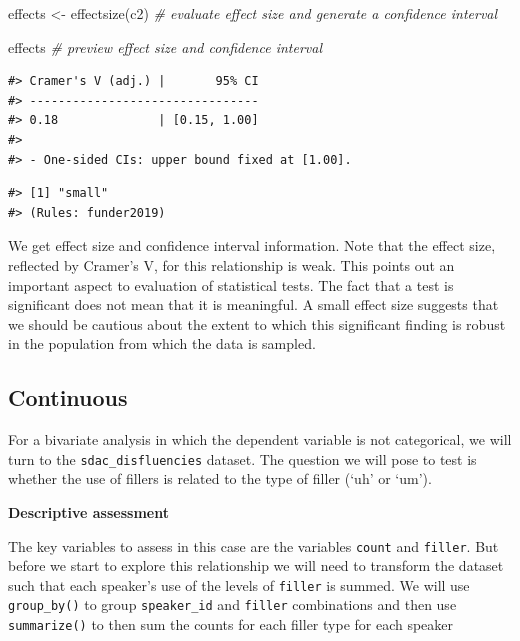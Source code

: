 \documentclass[
  letterpaper,
]{scrbook}
\newenvironment{Shaded}{\begin{snugshade}}{\end{snugshade}}
\newcommand{\CommentTok}[1]{\textcolor[rgb]{0.00,0.00,0.00}{\textit{#1}}}
\newcommand{\FunctionTok}[1]{\textcolor[rgb]{0.00,0.00,0.00}{#1}}
\newcommand{\NormalTok}[1]{\textcolor[rgb]{0.00,0.00,0.00}{#1}}
\newcommand{\OtherTok}[1]{\textcolor[rgb]{0.00,0.00,0.00}{#1}}
\newcommand{\SpecialCharTok}[1]{\textcolor[rgb]{0.00,0.00,0.00}{#1}}
\begin{document}
\begin{Shaded}
\begin{Highlighting}[]
\NormalTok{effects }\OtherTok{\textless{}{-}} \FunctionTok{effectsize}\NormalTok{(c2) }\CommentTok{\# evaluate effect size and generate a confidence interval}

\NormalTok{effects }\CommentTok{\# preview effect size and confidence interval}
\end{Highlighting}
\end{Shaded}

\begin{verbatim}
#> Cramer's V (adj.) |       95% CI
#> --------------------------------
#> 0.18              | [0.15, 1.00]
#> 
#> - One-sided CIs: upper bound fixed at [1.00].
\end{verbatim}

\begin{Shaded}
\end{Shaded}

\begin{verbatim}
#> [1] "small"
#> (Rules: funder2019)
\end{verbatim}

We get effect size and confidence interval information. Note that the
effect size, reflected by Cramer's V, for this relationship is weak.
This points out an important aspect to evaluation of statistical tests.
The fact that a test is significant does not mean that it is meaningful.
A small effect size suggests that we should be cautious about the extent
to which this significant finding is robust in the population from which
the data is sampled.

\hypertarget{continuous-1}{%
\subsection{Continuous}\label{continuous-1}}

For a bivariate analysis in which the dependent variable is not
categorical, we will turn to the \texttt{sdac\_disfluencies} dataset.
The question we will pose to test is whether the use of fillers is
related to the type of filler (`uh' or `um').

\textbf{Descriptive assessment}

The key variables to assess in this case are the variables
\texttt{count} and \texttt{filler}. But before we start to explore this
relationship we will need to transform the dataset such that each
speaker's use of the levels of \texttt{filler} is summed. We will use
\texttt{group\_by()} to group \texttt{speaker\_id} and \texttt{filler}
combinations and then use \texttt{summarize()} to then sum the counts
for each filler type for each speaker
\end{document}

